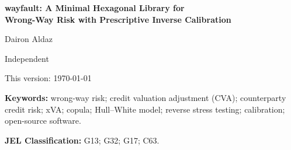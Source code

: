 \documentclass[12pt]{article}
\newcommand{\CVA}{\mathrm{CVA}}
\begin{document}
\begin{center}
{\LARGE\bfseries wayfault: A Minimal Hexagonal Library for\\[2pt]
Wrong-Way Risk with Prescriptive Inverse Calibration\par}
\vspace{1.2em}
{\large Dairon Aldaz\par}
\vspace{0.4em}
{\normalsize Independent\par}
\vspace{0.3em}
{\normalsize This version: \today\par}
\end{center}

\vspace{0.6em}

\begin{abstract}
\noindent
Wrong-way risk (WWR) is the adverse dependence between a counterparty's
exposure and its credit quality: exposure tends to be large precisely when the
counterparty is likely to default. We present \emph{wayfault}, a small,
dependency-light (numpy-only core) open-source Python library that quantifies
WWR for a single counterparty from a Monte-Carlo exposure cube and a credit
curve. The library computes baseline exposure metrics and unilateral credit
valuation adjustment (CVA), a \emph{conditional expected exposure given default}
under a pluggable dependence model, the WWR-adjusted CVA, and the empirical
multiplier $\alpha=\CVA_{\text{WWR}}/\CVA_{\text{indep}}$. We unify the
Hull--White stochastic-hazard model and the Gaussian, Clayton, and Frank copulas
under a single \emph{scenario re-weighting} core. Our main contribution is a
\emph{prescriptive inverse calibration}: given the proven monotonicity of
$\alpha$ in the dependence parameter, we root-find the parameter that reproduces
a \emph{target} multiplier or CVA, and we locate reverse-stress
\emph{breakpoints} at which a risk metric crosses a threshold. All structural
identities used by the implementation are machine-checked symbolically with a
computer-algebra system, and we report a worked example on a five-year swap.
\end{abstract}

\vspace{0.4em}
\noindent\textbf{Keywords:} wrong-way risk; credit valuation adjustment (CVA);
counterparty credit risk; xVA; copula; Hull--White model; reverse stress
testing; calibration; open-source software.

\vspace{0.3em}
\noindent\textbf{JEL Classification:} G13; G32; G17; C63.
\end{document}
